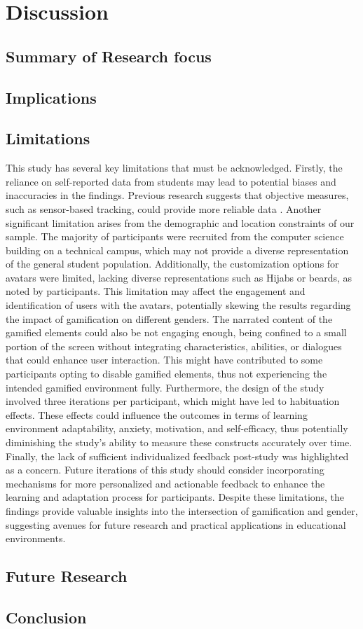 \section{Discussion}
\subsection{Summary of Research focus}
\subsection{Implications}
\subsection{Limitations}
This study has several key limitations that must be acknowledged. Firstly, the reliance on self-reported data from students may lead to potential biases and inaccuracies in the findings. Previous research suggests that objective measures, such as sensor-based tracking, could provide more reliable data \parencite{woolfAffectiveTutorsAutomatic2010}.
Another significant limitation arises from the demographic and location constraints of our sample. The majority of participants were recruited from the computer science building on a technical campus, which may not provide a diverse representation of the general student population.
Additionally, the customization options for avatars were limited, lacking diverse representations such as Hijabs or beards, as noted by participants. This limitation may affect the engagement and identification of users with the avatars, potentially skewing the results regarding the impact of gamification on different genders.
The narrated content of the gamified elements could also be not engaging enough, being confined to a small portion of the screen without integrating characteristics, abilities, or dialogues that could enhance user interaction. This might have contributed to some participants opting to disable gamified elements, thus not experiencing the intended gamified environment fully.
Furthermore, the design of the study involved three iterations per participant, which might have led to habituation effects. These effects could influence the outcomes in terms of learning environment adaptability, anxiety, motivation, and self-efficacy, thus potentially diminishing the study's ability to measure these constructs accurately over time.
Finally, the lack of sufficient individualized feedback post-study was highlighted as a concern. Future iterations of this study should consider incorporating mechanisms for more personalized and actionable feedback to enhance the learning and adaptation process for participants.
Despite these limitations, the findings provide valuable insights into the intersection of gamification and gender, suggesting avenues for future research and practical applications in educational environments.

\subsection{Future Research}
\subsection{Conclusion}